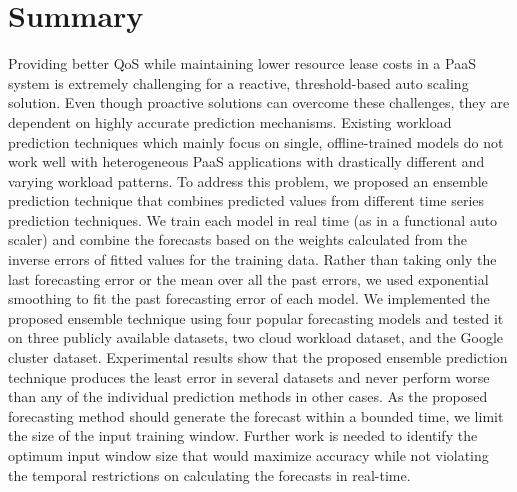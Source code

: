 \section{Summary}

Providing better QoS while maintaining lower resource lease costs in a PaaS system is extremely challenging for a reactive, threshold-based auto scaling solution. Even though proactive solutions can overcome these challenges, they are dependent on highly accurate prediction mechanisms. Existing workload prediction techniques which mainly focus on single, offline-trained models do not work well with heterogeneous PaaS applications with drastically different and varying workload patterns. To address this problem, we proposed an ensemble prediction technique that combines predicted values from different time series prediction techniques. We train each model in real time (as in a functional auto scaler) and combine the forecasts based on the weights calculated from the inverse errors of fitted values for the training data. Rather than taking only the last forecasting error or the mean over all the past errors, we used exponential smoothing to fit the past forecasting error of each model. We implemented the proposed ensemble technique using four popular forecasting models and tested it on three publicly available datasets, two cloud workload dataset, and the Google cluster dataset. Experimental results show that the proposed ensemble prediction technique produces the least error in several datasets and never perform worse than any of the individual prediction methods in other cases. As the proposed forecasting method should generate the forecast within a bounded time, we limit the size of the input training window. Further work is needed to identify the optimum input window size that would maximize accuracy while not violating the temporal restrictions on calculating the forecasts in real-time.